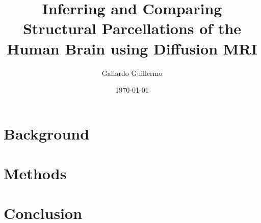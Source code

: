 \documentclass[a4paper, twoside, openright]{book}
\title{Inferring and Comparing Structural Parcellations of the Human Brain using Diffusion MRI}
\author{Gallardo Guillermo}
\date{\today}
\numberwithin{equation}{chapter}
\begin{document}
\setcounter{tocdepth}{1}

\frontmatter
    
    
    \tableofcontents
    \onecolumn
    
    \twocolumn
    
\mainmatter
    \part{Background}
    
    
    
    \part{Methods}
    
    
    
    \part{Conclusion}
    

%
\end{document}
